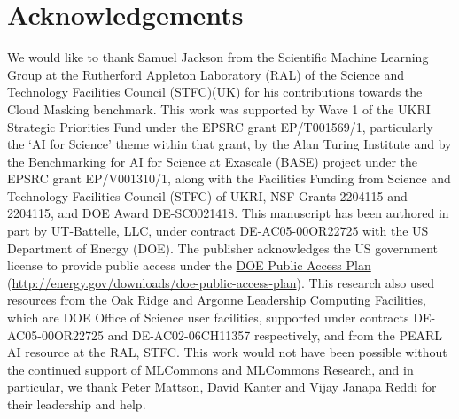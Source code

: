 \section*{Acknowledgements}
\begin{small}
We would like to thank Samuel Jackson from the Scientific Machine Learning Group at the Rutherford Appleton Laboratory (RAL) of the Science and Technology Facilities Council (STFC)(UK) for his contributions towards the Cloud Masking benchmark. This work was supported by Wave 1 of the UKRI Strategic Priorities Fund under the EPSRC grant EP/T001569/1, particularly the ‘AI for Science’ theme within that grant, by the Alan Turing Institute and by the Benchmarking for AI for Science at Exascale (BASE) project under the EPSRC grant EP/V001310/1, along with the Facilities Funding from Science and Technology Facilities Council (STFC) of UKRI, NSF Grants 2204115 and 2204115, and DOE Award DE-SC0021418. This manuscript has been authored in part by UT-Battelle, LLC, under contract DE-AC05-00OR22725 with the US Department of Energy (DOE). The publisher acknowledges the US government license to provide public access under the \href{http://energy.gov/downloads/doe-public-access-plan}{DOE Public Access Plan} (\url{http://energy.gov/downloads/doe-public-access-plan}). This research also used resources from the Oak Ridge and Argonne Leadership Computing Facilities, which are DOE Office of Science user facilities, supported under contracts DE-AC05-00OR22725 and DE-AC02-06CH11357 respectively, and from the PEARL AI resource at the RAL, STFC. This work would not have been  possible without the continued support of MLCommons and MLCommons Research, and in particular,  we thank Peter Mattson, David Kanter and Vijay Janapa Reddi for their leadership and help.
\end{small}


